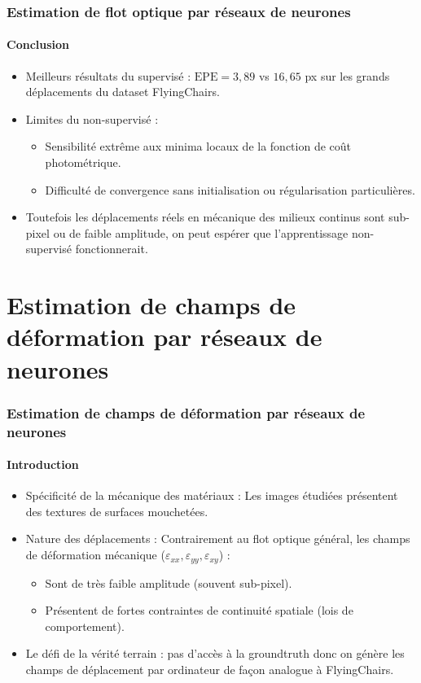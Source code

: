 \documentclass[aspectratio=169]{beamer}
\newcommand{\1}{\mathbf{1}}
\begin{document}
\begin{frame}
\frametitle{Estimation de flot optique par réseaux de neurones}
\framesubtitle{Conclusion}
\begin{itemize}
        \item Meilleurs résultats du supervisé : $\text{EPE} = 3,89$ vs $16,65$ px  sur les grands déplacements du dataset FlyingChairs.
        \pause
        \item Limites du non-supervisé :
        \pause
        \begin{itemize}
            \item Sensibilité extrême aux minima locaux de la fonction de coût photométrique.
            \pause
            \item Difficulté de convergence sans initialisation ou régularisation particulières.
            \pause
        \end{itemize}
        \item Toutefois les déplacements réels en mécanique des milieux continus sont sub-pixel ou de faible amplitude, on peut espérer que l'apprentissage non-supervisé fonctionnerait.
    \end{itemize}
\end{frame}

\section{Estimation de champs de déformation par réseaux de neurones}
\begin{frame}
\frametitle{Estimation de champs de déformation par réseaux de neurones}
\framesubtitle{Introduction}

\begin{itemize}
        \item Spécificité de la mécanique des matériaux : Les images étudiées présentent des textures de surfaces mouchetées.
        \pause
        \item Nature des déplacements : Contrairement au flot optique général, les champs de déformation mécanique ($\varepsilon_{xx}, \varepsilon_{yy}, \varepsilon_{xy}$) :
        \pause
        \begin{itemize}
            \item Sont de très faible amplitude (souvent sub-pixel).
            \pause
            \item Présentent de fortes contraintes de continuité spatiale (lois de comportement).
        \end{itemize}
        \pause
        \item Le défi de la vérité terrain : pas d'accès à la groundtruth donc on génère les champs de déplacement par ordinateur de façon analogue à FlyingChairs.
    \end{itemize}
\end{frame}
\end{document}
